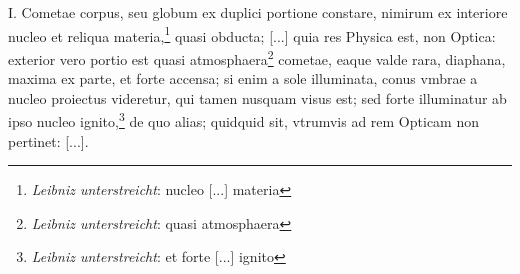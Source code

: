\pend \pstart [p.~174] I. Cometae\protect{} corpus, seu globum ex duplici portione constare, nimirum ex interiore nucleo et reliqua materia,\footnote{\textit{Leibniz unterstreicht}: nucleo [...] materia} quasi obducta; [...] quia res Physica est, non Optica: exterior vero portio est quasi atmosphaera\footnote{\textit{Leibniz unterstreicht}: quasi atmosphaera\protect{}} cometae\protect{}, eaque valde rara, diaphana, maxima ex parte, et forte accensa; si enim a sole illuminata, conus vmbrae a nucleo proiectus videretur, qui tamen nusquam visus est; sed forte illuminatur ab ipso nucleo ignito,\footnote{\textit{Leibniz unterstreicht}: et forte [...] ignito} de quo alias; quidquid sit, vtrumvis ad rem Opticam non pertinet: [...].